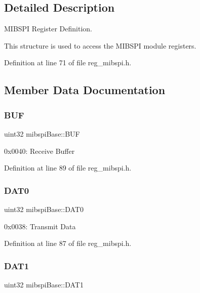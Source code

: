 \subsection{Detailed Description}
M\+I\+B\+S\+PI Register Definition. 

This structure is used to access the M\+I\+B\+S\+PI module registers. 

Definition at line 71 of file reg\+\_\+mibspi.\+h.



\subsection{Member Data Documentation}
\mbox{\label{structmibspiBase_a0c46d59f7f8019e0b7ab575dd69f7f7d}} 
\subsubsection{\texorpdfstring{B\+UF}{BUF}}
{\footnotesize\ttfamily uint32 mibspi\+Base\+::\+B\+UF}

0x0040\+: Receive Buffer 

Definition at line 89 of file reg\+\_\+mibspi.\+h.

\mbox{\label{structmibspiBase_ac5e7000b8276c4b1f39e2ca8d2da4090}} 
\subsubsection{\texorpdfstring{D\+A\+T0}{DAT0}}
{\footnotesize\ttfamily uint32 mibspi\+Base\+::\+D\+A\+T0}

0x0038\+: Transmit Data 

Definition at line 87 of file reg\+\_\+mibspi.\+h.

\mbox{\label{structmibspiBase_aacd4c66146c815e386d56b030616df41}} 
\subsubsection{\texorpdfstring{D\+A\+T1}{DAT1}}
{\footnotesize\ttfamily uint32 mibspi\+Base\+::\+D\+A\+T1}

